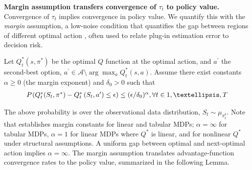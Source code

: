 \documentclass[opre,nonblindrev]{informs4}
\newcommand{\az}[1]{{\color{purple} [\textbf{az:}~#1]}}
\newcommand{\blipadv}{\tau}
\begin{document}
\textbf{Margin assumption transfers convergence of $\blipadv_t$ to policy value. }Convergence of $\blipadv_t$ implies convergence in policy value. We quantify this with the \textit{margin} assumption, a low-noise condition that quantifies the gap between regions of different optimal action \citep{tsybakov2004optimal}, often used to relate plug-in estimation error  to decision risk. 
\begin{assumption}\label{asn-margin-observational-pib}
Let $Q^{*}_t(s, \pi^*)$ be the optimal $Q$ function at the optimal action, and $a^{\prime}$ the second-best option, $a^{\prime} \in \mathcal{A}\setminus \arg \max _a Q^{*}_t(s, a).$
Assume there exist constants $\alpha\geq0$ (the margin exponent) and
$\delta_0>0$ such that
$$
\begin{aligned}
\textstyle
P_{ 
}
\left( Q^{*}_t(S_t, \pi^*)
-Q^{*}_t\left(S_t, a^{\prime}\right) \leq \epsilon\right)
\leq (\epsilon/\delta_0)^\alpha
, \forall t \in 1, \dots, T
\end{aligned}
$$
\end{assumption}
The above probability is over the observational data distribution, $S_t \sim \mu_{\pi^b_t}$.
Note that \citep{hu2024fast} establishes margin constants for linear and tabular MDPs; {$\alpha = \infty$ for tabular MDPs, $\alpha=1$ for linear MDPs where $Q^*$ is linear, and for nonlinear $Q^*$ under structural assumptions}. A uniform gap between optimal and next-optimal action implies $\alpha=\infty$. {The margin assumption translates advantage-function convergence rates to the policy value, summarized in the following Lemma.}%
\end{document}
